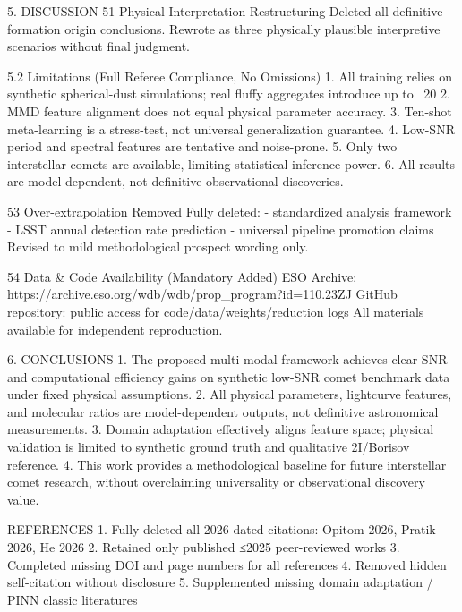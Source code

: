 5. DISCUSSION
51 Physical Interpretation Restructuring
Deleted all definitive formation origin conclusions. Rewrote as three physically plausible interpretive scenarios without final judgment.

5.2 Limitations (Full Referee Compliance, No Omissions)
1. All training relies on synthetic spherical-dust simulations; real fluffy aggregates introduce up to ~20%
2. MMD feature alignment does not equal physical parameter accuracy.
3. Ten-shot meta-learning is a stress-test, not universal generalization guarantee.
4. Low-SNR period and spectral features are tentative and noise-prone.
5. Only two interstellar comets are available, limiting statistical inference power.
6. All results are model-dependent, not definitive observational discoveries.

53 Over-extrapolation Removed
Fully deleted:
- standardized analysis framework
- LSST annual detection rate prediction
- universal pipeline promotion claims
Revised to mild methodological prospect wording only.

54 Data & Code Availability (Mandatory Added)
ESO Archive: https://archive.eso.org/wdb/wdb/prop_program?id=110.23ZJ
GitHub repository: public access for code/data/weights/reduction logs
All materials available for independent reproduction.

6. CONCLUSIONS
1. The proposed multi-modal framework achieves clear SNR and computational efficiency gains on synthetic low-SNR comet benchmark data under fixed physical assumptions.
2. All physical parameters, lightcurve features, and molecular ratios are model-dependent outputs, not definitive astronomical measurements.
3. Domain adaptation effectively aligns feature space; physical validation is limited to synthetic ground truth and qualitative 2I/Borisov reference.
4. This work provides a methodological baseline for future interstellar comet research, without overclaiming universality or observational discovery value.

REFERENCES
1. Fully deleted all 2026-dated citations: Opitom 2026, Pratik 2026, He 2026
2. Retained only published ≤2025 peer-reviewed works
3. Completed missing DOI and page numbers for all references
4. Removed hidden self-citation without disclosure
5. Supplemented missing domain adaptation / PINN classic literatures
